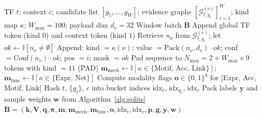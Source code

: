 \documentclass{article}
\begin{document}
\begin{algorithm}[H]
\caption{Window Tensorization}
\label{alg:tensorize}
\begin{algorithmic}[1]
\Require TF $t$; context $c$; candidate list $[g_1,\ldots,g_W]$;
         evidence graphs $[\mathcal{G}_{t,g_i}^{(c)}]_{i=1}^{W}$;
         kind map $\kappa$; $W_{\max} = 100$; payload dim $d_v = 32$
\Ensure  Window batch $\mathbf{B}$
\State Append global TF token (kind $0$) and context token (kind $1$)
    \State Retrieve $n_\nu$ from $\mathcal{G}_{t,g_i}^{(c)}$;\;
           let $\mathit{ok} \leftarrow \mathbb{I}[n_\nu \ne \emptyset]$
    \State Append: kind $= \kappa(\nu)$;\;
                   value $= \mathrm{Pack}(n_\nu, d_v) \cdot \mathit{ok}$;\;
                   conf $= \mathrm{Conf}(n_\nu) \cdot \mathit{ok}$;\;
                   pos $= i$;\;
                   mask $= \mathit{ok}$
  \EndFor
\EndFor
\State Pad sequence to $N_{\max} = 2 + W_{\max} \times 9$ tokens with kind $= 11$ (PAD)
\State $\mathbf{m}_{\mathrm{mech}} \leftarrow \mathbb{I}[\kappa \in \{\text{Motif, Acc, Link}\}]$;\;
       $\mathbf{m}_{\mathrm{func}} \leftarrow \mathbb{I}[\kappa \in \{\text{Expr, Net}\}]$
\State Compute modality flags $\mathbf{o} \in \{0,1\}^4$ for [Expr, Acc, Motif, Link]
\State Hash $t$, $\{g_i\}$, $c$ into bucket indices $\mathrm{idx}_t$, $\mathrm{idx}_{g_i}$, $\mathrm{idx}_c$
\State Pack labels $\mathbf{y}$ and sample weights $\mathbf{w}$ from Algorithm~\ref{alg:splits}
\State \Return $\mathbf{B} = (\mathbf{k}, \mathbf{V}, \mathbf{q}, \boldsymbol{\pi}, \mathbf{m}, \mathbf{m}_{\mathrm{mech}}, \mathbf{m}_{\mathrm{func}}, \mathbf{o}, \mathrm{idx}_t, \mathrm{idx}_c, \mathbf{p}, \mathbf{g}, \mathbf{y}, \mathbf{w})$
\end{algorithmic}
\end{algorithm}
\end{document}
